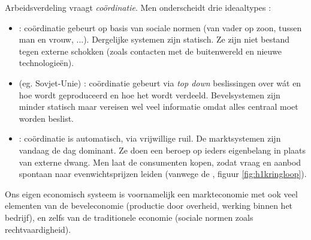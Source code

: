 \par Arbeidsverdeling vraagt \textit{co\"ordinatie}. Men onderscheidt drie ideaaltypes : 
\begin{itemize}
\item {} : co\"ordinatie gebeurt op basis van sociale normen (van vader op zoon, tussen man en vrouw, ...). Dergelijke systemen zijn statisch. Ze zijn niet bestand tegen externe schokken (zoals contacten met de buitenwereld en nieuwe technologie\"en).
\item {} (eg. Sovjet-Unie) : co\"ordinatie gebeurt via \textit{top down} beslissingen over w\'at en hoe wordt geproduceerd en hoe het wordt verdeeld. Bevelsystemen zijn minder statisch maar vereisen wel veel informatie omdat alles centraal moet worden beslist.
\item {} : co\"ordinatie is automatisch, via vrijwillige ruil. De marktsystemen zijn vandaag de dag dominant. Ze doen een beroep op ieders eigenbelang in plaats van externe dwang. Men laat de consumenten kopen, zodat vraag en aanbod spontaan naar evenwichtsprijzen leiden (vanwege de , figuur \ref{fig:h1kringloop}).
\end{itemize}

\par Ons eigen economisch systeem is voornamelijk een markteconomie met ook veel elementen van de beveleconomie (productie door overheid, werking binnen het bedrijf), en zelfs van de traditionele economie (sociale normen zoals rechtvaardigheid).

